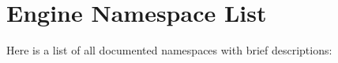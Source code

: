 \section{Engine Namespace List}
Here is a list of all documented namespaces with brief descriptions:\begin{CompactList}
\item{}
\end{CompactList}
